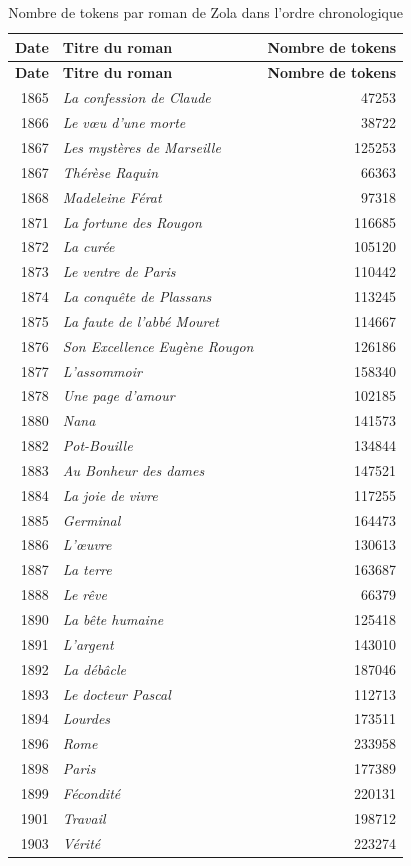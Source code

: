 \begin{longtable}{r p{8cm} r}
\caption{Nombre de tokens par roman de Zola dans l’ordre chronologique}
\label{tab:tokens_romans_zola} \\

\toprule
\textbf{Date} & \textbf{Titre du roman} & \textbf{Nombre de tokens} \\
\midrule
\endfirsthead

\toprule
\textbf{Date} & \textbf{Titre du roman} & \textbf{Nombre de tokens} \\
\midrule
\endhead

1865 & \textit{La confession de Claude} & 47253 \\
1866 & \textit{Le vœu d'une morte} & 38722 \\
1867 & \textit{Les mystères de Marseille} & 125253 \\
1867 & \textit{Thérèse Raquin} & 66363 \\
1868 & \textit{Madeleine Férat} & 97318 \\
1871 & \textit{La fortune des Rougon} & 116685 \\
1872 & \textit{La curée} & 105120 \\
1873 & \textit{Le ventre de Paris} & 110442 \\
1874 & \textit{La conquête de Plassans} & 113245 \\
1875 & \textit{La faute de l'abbé Mouret} & 114667 \\
1876 & \textit{Son Excellence Eugène Rougon} & 126186 \\
1877 & \textit{L'assommoir} & 158340 \\
1878 & \textit{Une page d'amour} & 102185 \\
1880 & \textit{Nana} & 141573 \\
1882 & \textit{Pot-Bouille} & 134844 \\
1883 & \textit{Au Bonheur des dames} & 147521 \\
1884 & \textit{La joie de vivre} & 117255 \\
1885 & \textit{Germinal} & 164473 \\
1886 & \textit{L'œuvre} & 130613 \\
1887 & \textit{La terre} & 163687 \\
1888 & \textit{Le rêve} & 66379 \\
1890 & \textit{La bête humaine} & 125418 \\
1891 & \textit{L'argent} & 143010 \\
1892 & \textit{La débâcle} & 187046 \\
1893 & \textit{Le docteur Pascal} & 112713 \\
1894 & \textit{Lourdes} & 173511 \\
1896 & \textit{Rome} & 233958 \\
1898 & \textit{Paris} & 177389 \\
1899 & \textit{Fécondité} & 220131 \\
1901 & \textit{Travail} & 198712 \\
1903 & \textit{Vérité} & 223274 \\

\bottomrule
\end{longtable}

